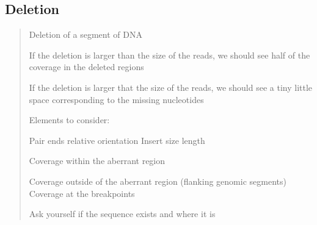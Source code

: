 \hypertarget{deletion}{%
\subsection{Deletion}\label{deletion}}

\begin{quote}
Deletion of a segment of DNA

If the deletion is larger than the size of the reads, we should see half
of the coverage in the deleted regions

If the deletion is larger that the size of the reads, we should see a
tiny little space corresponding to the missing nucleotides

Elements to consider:

Pair ends relative orientation Insert size length

Coverage within the aberrant region

Coverage outside of the aberrant region (flanking genomic segments)
Coverage at the breakpoints

Ask yourself if the sequence exists and where it is
\end{quote}
